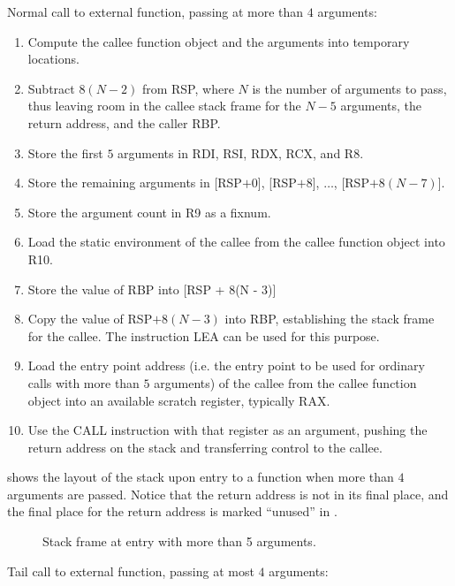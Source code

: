 Normal call to external function, passing at more than $4$ arguments:

\begin{enumerate}
\item Compute the callee function object and the arguments into
  temporary locations.
\item Subtract $8(N - 2)$ from RSP, where $N$ is the number of
  arguments to pass, thus leaving room in the callee stack frame for
  the $N - 5$ arguments, the return address, and the caller RBP.
\item Store the first $5$ arguments in RDI, RSI, RDX, RCX, and R8.
\item Store the remaining arguments in [RSP$ + 0$], [RSP$ + 8$],
  $\ldots$, [RSP$ + 8(N - 7)$].
\item Store the argument count in R9 as a fixnum.
\item Load the static environment of the callee from the callee
  function object into R10.
\item Store the value of RBP into [RSP + 8(N - 3)]
\item Copy the value of RSP$ + 8(N - 3)$ into RBP, establishing the
  stack frame for the callee.  The instruction LEA can be used for
  this purpose.
\item Load the entry point address (i.e. the entry point to be used
  for ordinary calls with more than $5$ arguments) of the callee from
  the callee function object into an available scratch register,
  typically RAX.
\item Use the CALL instruction with that register as an argument,
  pushing the return address on the stack and transferring control to
  the callee.
\end{enumerate}

 shows the layout of the stack
upon entry to a function when more than $4$ arguments are passed.
Notice that the return address is not in its final place, and the
final place for the return address is marked ``unused'' in
.

\begin{figure}
\begin{center}
\end{center}
\caption{\label{fig-x86-64-stack-frame-at-entry}
Stack frame at entry with more than 5 arguments.}
\end{figure}

Tail call to external function, passing at most $4$ arguments:

